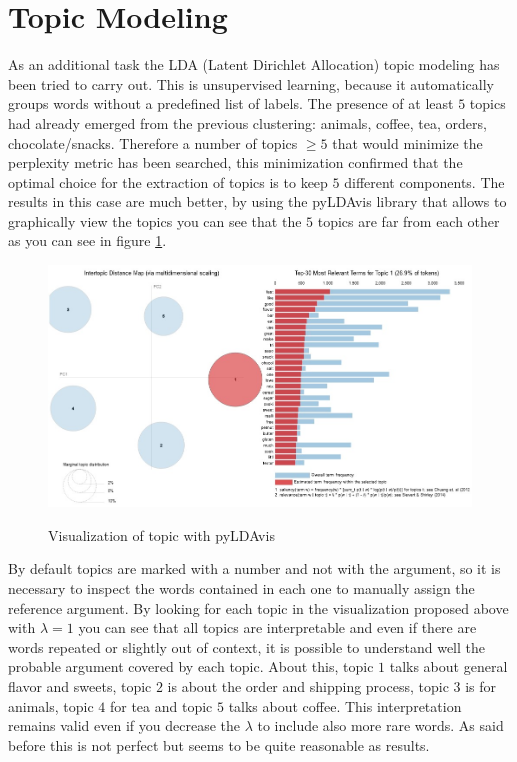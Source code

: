\documentclass[11pt]{article}
\begin{document}
\section{Topic Modeling}
As an additional task the LDA (Latent Dirichlet Allocation) topic modeling has been tried to carry out. This is unsupervised learning, because it automatically groups words without a predefined list of labels.
The presence of at least $5$ topics had already emerged from the previous clustering: animals, coffee, tea, orders, chocolate/snacks. Therefore a number of topics  $\geq 5$ that would minimize the perplexity metric has been searched, this minimization confirmed that the optimal choice for the extraction of topics is to keep $5$ different components. The results in this case are much better, by using the pyLDAvis library that allows to graphically view the topics you can see that the $5$ topics are far from each other as you can see in figure \ref{top_mod_pyLDAvis}.
\begin{figure}[H]
\begin{center}
  \includegraphics[scale = 0.5]{img/LDA.jpg}\\
  \caption{Visualization of topic with pyLDAvis}
  \label{top_mod_pyLDAvis}
\end{center}
\end{figure}
\noindent By default topics are marked with a number and not with the argument, so it is necessary to inspect the words contained in each one to manually assign the reference argument. By looking for each topic in the visualization proposed above with $\lambda = 1$ you can see that all topics are interpretable and even if there are words repeated or slightly out of context, it is possible to understand well the probable argument covered by each topic. About this, topic $1$ talks about general flavor and sweets, topic $2$ is about the order and shipping process, topic $3$ is for animals, topic $4$ for tea and topic $5$ talks about coffee. This interpretation remains valid even if you decrease the $\lambda$ to include also more rare words. As said before this is not perfect but seems to be quite reasonable as results.
\end{document}
